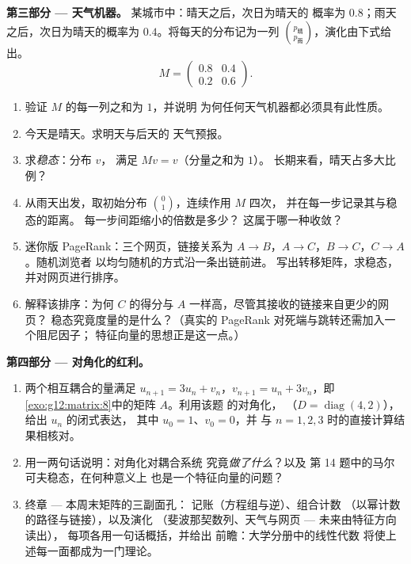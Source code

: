 \begin{problem}
\medskip
\noindent\textbf{第三部分 --- 天气机器。}
某城市中：晴天之后，次日为晴天的
概率为 $0.8$；雨天之后，次日为晴天的概率为
$0.4$。将每天的分布记为一列
$\binom{p_{\text{晴}}}{p_{\text{雨}}}$，演化由下式给出。
\[
M = \begin{pmatrix} 0.8 & 0.4\\ 0.2 & 0.6 \end{pmatrix}.
\]
\begin{enumerate}[resume]
  \item 验证 $M$ 的每一列之和为 $1$，并说明
        为何任何天气机器都必须具有此性质。
  \item 今天是晴天。求明天与后天的
        天气预报。
  \item 求\emph{稳态}：分布 $v$，
        满足 $Mv = v$（分量之和为 $1$）。
        长期来看，晴天占多大比例？
  \item 从雨天出发，取初始分布 $\binom01$，连续作用 $M$ 四次，
        并在每一步记录其与稳态的距离。
        每一步间距缩小的倍数是多少？
        这属于哪一种收敛？
  \item 迷你版 PageRank：三个网页，链接关系为
        $A \to B$，$A \to C$，$B \to C$，$C \to A$。随机浏览者
        以均匀随机的方式沿一条出链前进。
        写出转移矩阵，求稳态，
        并对网页进行排序。
  \item 解释该排序：为何 $C$ 的得分与
        $A$ 一样高，尽管其接收的链接来自更少的网页？
        稳态究竟度量的是什么？（真实的 PageRank
        对死端与跳转还需加入一个阻尼因子；
        特征向量的思想正是这一点。）
\end{enumerate}

\medskip
\noindent\textbf{第四部分 --- 对角化的红利。}
\begin{enumerate}[resume]
  \item 两个相互耦合的量满足
        $u_{n+1} = 3u_n + v_n$，$v_{n+1} = u_n + 3v_n$，即
        \cref{exo:g12:matrix:8}中的矩阵 $A$。利用该题
        的对角化，
        （$D = \operatorname{diag}(4, 2)$），给出 $u_n$ 的闭式表达，
        其中 $u_0 = 1$、$v_0 = 0$，并
        与 $n = 1, 2, 3$ 时的直接计算结果相核对。
  \item 用一两句话说明：对角化对耦合系统
        究竟\emph{做了什么}？以及
        第 14 题中的马尔可夫稳态，在何种意义上
        也是一个特征向量的问题？
  \item 终章 --- 本周末矩阵的三副面孔：
        记账（方程组与逆）、组合计数
        （以幂计数的路径与链接），以及演化
        （斐波那契数列、天气与网页 --- 未来由特征方向读出），
        每项各用一句话概括，并给出
        前瞻：大学分册中的线性代数
        将使上述每一面都成为一门理论。
\end{enumerate}
\end{problem}
